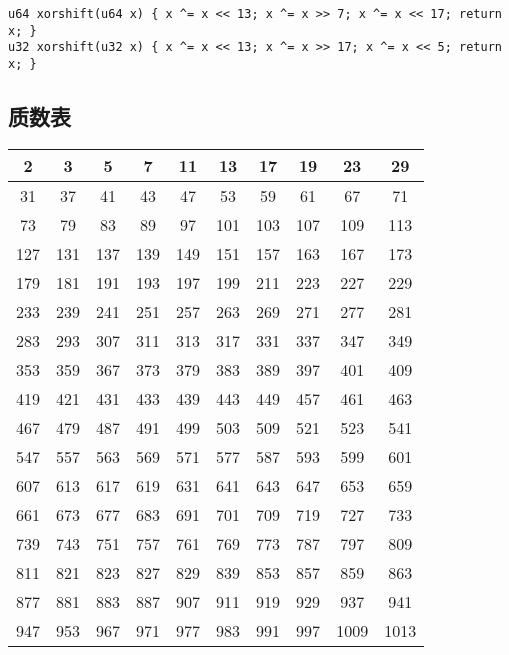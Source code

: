 \documentclass[a4paper,landscape,twocolumn]{ctexart}
\begin{document}
\begin{lstlisting}
u64 xorshift(u64 x) { x ^= x << 13; x ^= x >> 7; x ^= x << 17; return x; }
u32 xorshift(u32 x) { x ^= x << 13; x ^= x >> 17; x ^= x << 5; return x; }
\end{lstlisting}

\subsection{质数表}

\begin{tabular}{|c|c|c|c|c|c|c|c|c|c|}
\hline
2 & 3 & 5 & 7 & 11 & 13 & 17 & 19 & 23 & 29\\
\hline
31 & 37 & 41 & 43 & 47 & 53 & 59 & 61 & 67 & 71\\
\hline
73 & 79 & 83 & 89 & 97 & 101 & 103 & 107 & 109 & 113\\
\hline
127 & 131 & 137 & 139 & 149 & 151 & 157 & 163 & 167 & 173\\
\hline
179 & 181 & 191 & 193 & 197 & 199 & 211 & 223 & 227 & 229\\
\hline
233 & 239 & 241 & 251 & 257 & 263 & 269 & 271 & 277 & 281\\
\hline
283 & 293 & 307 & 311 & 313 & 317 & 331 & 337 & 347 & 349\\
\hline
353 & 359 & 367 & 373 & 379 & 383 & 389 & 397 & 401 & 409\\
\hline
419 & 421 & 431 & 433 & 439 & 443 & 449 & 457 & 461 & 463\\
\hline
467 & 479 & 487 & 491 & 499 & 503 & 509 & 521 & 523 & 541\\
\hline
547 & 557 & 563 & 569 & 571 & 577 & 587 & 593 & 599 & 601\\
\hline
607 & 613 & 617 & 619 & 631 & 641 & 643 & 647 & 653 & 659\\
\hline
661 & 673 & 677 & 683 & 691 & 701 & 709 & 719 & 727 & 733\\
\hline
739 & 743 & 751 & 757 & 761 & 769 & 773 & 787 & 797 & 809\\
\hline
811 & 821 & 823 & 827 & 829 & 839 & 853 & 857 & 859 & 863\\
\hline
877 & 881 & 883 & 887 & 907 & 911 & 919 & 929 & 937 & 941\\
\hline
947 & 953 & 967 & 971 & 977 & 983 & 991 & 997 & 1009 & 1013\\
\hline
\end{tabular}


%
%
\end{document}
